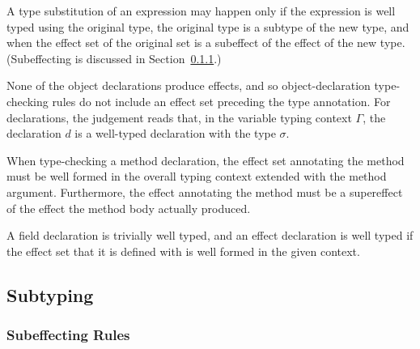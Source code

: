 A type substitution of an expression may happen only if the expression is well typed using the original type, the original type is a subtype of the new type, and when the effect set of the original set is a subeffect of the effect of the new type. (Subeffecting is discussed in Section~\ref{sec-subeffecting}.)

None of the object declarations produce effects, and so object-declaration type-checking rules do not include an effect set preceding the type annotation. For declarations, the judgement reads that, in the variable typing context $\Gamma$, the declaration $d$ is a well-typed declaration with the type $\sigma$.

When type-checking a method declaration, the effect set annotating the method must be well formed in the overall typing context extended with the method argument. Furthermore, the effect annotating the method must be a supereffect of the effect the method body actually produced. 

A field declaration is trivially well typed, and an effect declaration is well typed if the effect set that it is defined with is well formed in the given context.


\subsection{Subtyping}

\subsubsection{Subeffecting Rules}
\label{sec-subeffecting}

